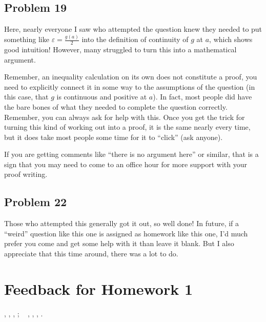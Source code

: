 \documentclass[letterpaper,10pt,english]{jupyterBook}
\begin{document}
\subsection{Problem 19}
\label{\detokenize{HW-feedback:problem-19}}
\sphinxAtStartPar
Here, nearly everyone I saw who attempted the question knew they needed to put something like \(\varepsilon=\frac{g(a)}{2}\) into the definition of continuity of \(g\) at \(a\), which shows good intuition! However, many struggled to turn this into a mathematical argument.

\sphinxAtStartPar
Remember, an inequality calculation on its own does not constitute a proof, you need to explicitly connect it in some way to the assumptions of the question (in this case, that \(g\) is continuous and positive at \(a\)). In fact, most people did have the bare bones of what they needed to complete the question correctly. Remember, you can always ask for help with this. Once you get the trick for turning this kind of working out into a proof, it is the same nearly every time, but it does take most people some time for it to “click” (ask anyone).

\sphinxAtStartPar
If you are getting comments like “there is no argument here” or similar, that is a sign that you may need to come to an office hour for more support with your proof writing.


\subsection{Problem 22}
\label{\detokenize{HW-feedback:problem-22}}
\sphinxAtStartPar
Those who attempted this generally got it out, so well done! In future, if a “weird” question like this one is assigned as homework like this one, I’d much prefer you come and get some help with it than leave it blank. But I also appreciate that this time around, there was a lot to do.


\section{Feedback for Homework 1}
\label{\detokenize{HW-feedback:feedback-for-homework-1}}
\sphinxAtStartPar
{} {\hyperref[\detokenize{Problems:p2}]{}}, {\hyperref[\detokenize{Problems:p3}]{}}, {\hyperref[\detokenize{Problems:id2}]{}}, {\hyperref[\detokenize{Problems:id3}]{}};   {\hyperref[\detokenize{Solutions-upto46:p2sol}]{}}, {\hyperref[\detokenize{Solutions-upto46:p3sol}]{}}, {\hyperref[\detokenize{Solutions-upto46:id1}]{}}, {\hyperref[\detokenize{Solutions-upto46:id2}]{}}.
\end{document}
